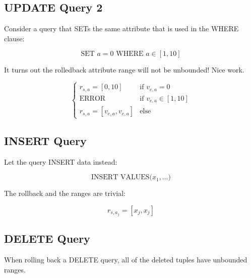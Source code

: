 \documentclass{article}
\begin{document}
\subsection{UPDATE Query 2}

Consider a query that SETs the same attribute that is used in the WHERE clause:

\[
\text{SET } a=0 \text{ WHERE } a \in [1, 10] 
\]

It turns out the rolledback attribute range will not be unbounded!  Nice work.

$$
\begin{cases}
  r_{s,a} = [0,10]              & \mbox{if } v_{e,a} =   0\\
  \text{ERROR}                  & \mbox{if } v_{e,a} \in [1, 10]\\
  r_{s,a} = [v_{e,a}, v_{e,a}]  & \mbox{else}
\end{cases}
$$

\subsection{INSERT Query}

Let the query INSERT data instead:

\[
\text{INSERT VALUES(}x_1,\ldots\text{)}
\]

The rollback and the ranges are trivial:

$$r_{s,a_j} = [x_j, x_j]$$


\subsection{DELETE Query}

When rolling back a DELETE query, all of the deleted tuples 
have unbounded ranges.
\end{document}
